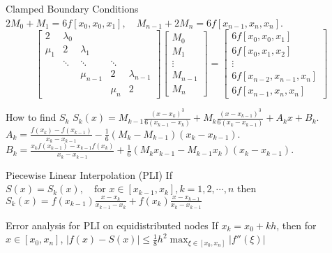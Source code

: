 \documentclass[10pt,landscape]{article}
\theoremstyle{definition}
\newcommand{\thistheoremname}{}
\newtheorem*{genericthm*}{\thistheoremname}
\newenvironment{namedthm*}[1]
{\renewcommand{\thistheoremname}{#1}\begin{genericthm*}}
{\end{genericthm*}}
\begin{document}
\begin{multicols}{3}
	\begin{namedthm*}{Clamped Boundary Conditions}\(2 M_{0}+M_{1}=6 f\left[x_{0}, x_{0}, x_{1}\right], \quad M_{n-1}+2 M_{n}=6 f\left[x_{n-1}, x_{n}, x_{n}\right]\).
		\[
			\begin{bmatrix}
				2     & \lambda_0 &           &        &               \\
				\mu_1 & 2         & \lambda_1 &        &               \\
				      & \ddots    & \ddots    & \ddots &               \\
				      &           & \mu_{n-1} & 2      & \lambda_{n-1} \\
				      &           &           & \mu_n  & 2
			\end{bmatrix}
			\begin{bmatrix}
				M_0     \\
				M_1     \\
				\vdots  \\
				M_{n-1} \\
				M_{n}
			\end{bmatrix} =
			\begin{bmatrix}
				6f[x_0,x_0,x_1]           \\
				6f[x_0,x_1,x_2]           \\
				\vdots                    \\
				6f[x_{n-2},x_{n-1},x_{n}] \\
				6f[x_{n-1},x_{n}, x_n]
			\end{bmatrix}
		\]
	\end{namedthm*}

	\begin{namedthm*}{How to find \(S_k\)} \(S_{k}(x)=M_{k-1} \frac{\left(x-x_{k}\right)^{3}}{6\left(x_{k-1}-x_{k}\right)}+M_{k} \frac{\left(x-x_{k-1}\right)^{3}}{6\left(x_{k}-x_{k-1}\right)}+A_{k} x+B_{k}\). \(A_{k}=\frac{f\left(x_{k}\right)-f\left(x_{k-1}\right)}{x_{k}-x_{k-1}}-\frac{1}{6}\left(M_{k}-M_{k-1}\right)\left(x_{k}-x_{k-1}\right)\).\\ \(B_{k}=\frac{x_{k} f\left(x_{k-1}\right)-x_{k-1} f\left(x_{k}\right)}{x_{k}-x_{k-1}}+\frac{1}{6}\left(M_{k} x_{k-1}-M_{k-1} x_{k}\right)\left(x_{k}-x_{k-1}\right)\).
	\end{namedthm*}
	\begin{namedthm*}{Piecewise Linear Interpolation (PLI)} If \(S(x) = S_k(x), \quad \text {for } x\in [x_{k-1}, x_k], k = 1,2,\cdots, n\) then
		\(S_k(x)=f(x_{k-1}) \frac{x-x_k}{x_{k-1}-x_{k}}+f(x_k) \frac{x-x_{k-1}}{x_k-x_{k-1}}\)
	\end{namedthm*}
	\begin{namedthm*}{Error analysis for PLI on equidistributed nodes}
		If \(x_{k}=x_{0}+k h\), then for \(x \in [x_0,x_n]\), \(|f(x)-S(x)| \leq \frac{1}{8}h^2\max_{\xi \in [x_0,x_n]}|f''(\xi)|\)
	\end{namedthm*}



\end{multicols}
\end{document}
